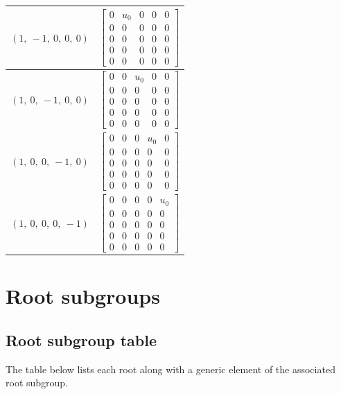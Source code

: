 \documentclass[11pt]{article}
\newcommand{\noi}{\noindent}
\theoremstyle{definition}
\begin{document}
\begin{tabular}{|l|c|}
    \hline
    $\left( 1, \  -1, \  0, \  0, \  0\right)$ & $\left[\begin{matrix}0 & u_{0} & 0 & 0 & 0\\0 & 0 & 0 & 0 & 0\\0 & 0 & 0 & 0 & 0\\0 & 0 & 0 & 0 & 0\\0 & 0 & 0 & 0 & 0\end{matrix}\right]$ \\
    \hline
    $\left( 1, \  0, \  -1, \  0, \  0\right)$ & $\left[\begin{matrix}0 & 0 & u_{0} & 0 & 0\\0 & 0 & 0 & 0 & 0\\0 & 0 & 0 & 0 & 0\\0 & 0 & 0 & 0 & 0\\0 & 0 & 0 & 0 & 0\end{matrix}\right]$ \\
    \hline
    $\left( 1, \  0, \  0, \  -1, \  0\right)$ & $\left[\begin{matrix}0 & 0 & 0 & u_{0} & 0\\0 & 0 & 0 & 0 & 0\\0 & 0 & 0 & 0 & 0\\0 & 0 & 0 & 0 & 0\\0 & 0 & 0 & 0 & 0\end{matrix}\right]$ \\
    \hline
    $\left( 1, \  0, \  0, \  0, \  -1\right)$ & $\left[\begin{matrix}0 & 0 & 0 & 0 & u_{0}\\0 & 0 & 0 & 0 & 0\\0 & 0 & 0 & 0 & 0\\0 & 0 & 0 & 0 & 0\\0 & 0 & 0 & 0 & 0\end{matrix}\right]$ \\
    \hline
\end{tabular}


\newpage
\section{Root subgroups}

\subsection{Root subgroup table}

\noi The table below lists each root along with a generic element of the associated root subgroup.
\end{document}
